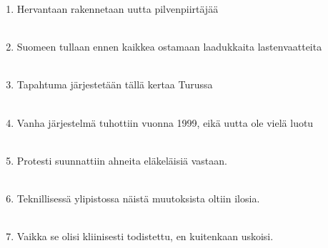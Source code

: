 \documentclass[paper=a4, fontsize=11pt]{scrartcl}
\begin{document}
\begin{enumerate}
    \item Hervantaan rakennetaan uutta pilvenpiirtäjää \\
    \underline{\hspace{14cm}} \\
    \item Suomeen tullaan ennen kaikkea ostamaan laadukkaita lastenvaatteita \\
    \underline{\hspace{14cm}} \\
    \item Tapahtuma järjestetään tällä kertaa Turussa \\
    \underline{\hspace{14cm}} \\
    \item Vanha järjestelmä tuhottiin vuonna 1999, eikä uutta ole vielä luotu \\
    \underline{\hspace{14cm}} \\
    \item Protesti suunnattiin ahneita eläkeläisiä vastaan. \\
    \underline{\hspace{14cm}} \\
    \item Teknillisessä ylipistossa näistä muutoksista oltiin ilosia. \\
    \underline{\hspace{14cm}} \\
    \item Vaikka se olisi kliinisesti todistettu, en kuitenkaan uskoisi.  \\
    \underline{\hspace{14cm}} 
\end{enumerate}
\end{document}
